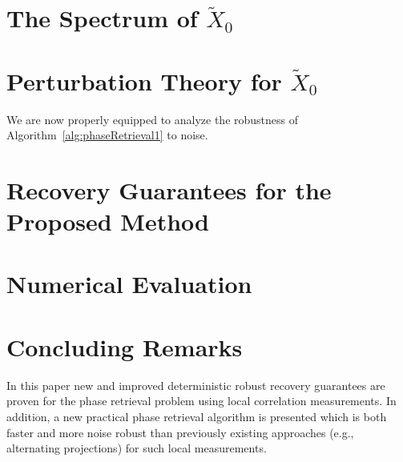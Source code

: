 \documentclass[11pt]{amsart}
\newcommand{\RSnote}[1]{\textcolor{blue}{[{\em {\bf **RS Note:} #1}]}}
\def \X { X}
\begin{document}
%

\section{The Spectrum of $\tilde{\X}_0$}
\label{sec:Spectrum}


\section{Perturbation Theory for $\tilde{\X}_0$}
\label{sec:Perturb}


We are now properly equipped to analyze the robustness of Algorithm~\ref{alg:phaseRetrieval1} to noise.

\section{Recovery Guarantees for the Proposed Method}
\label{sec:RecovGuarantee}


\section{Numerical Evaluation}
\label{sec:NumEval}


\section{Concluding Remarks}
\label{sec:conclusion}

In this paper new and improved deterministic robust recovery guarantees are proven for the phase retrieval problem using local correlation measurements.  In addition, a new practical phase retrieval algorithm is presented which is both faster and more noise robust than previously existing approaches (e.g., alternating projections) for such local measurements.  
\end{document}
